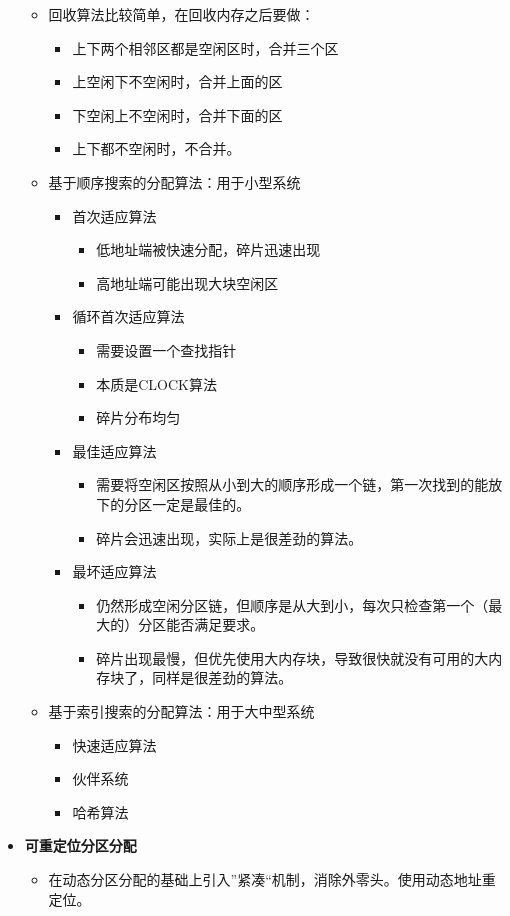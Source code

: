 \documentclass[12pt, a4paper, oneside]{ctexart}
\begin{document}
\begin{itemize}
\begin{itemize}
    \item 回收算法比较简单，在回收内存之后要做：
    \begin{itemize}
      \item 上下两个相邻区都是空闲区时，合并三个区
      \item 上空闲下不空闲时，合并上面的区
      \item 下空闲上不空闲时，合并下面的区
      \item 上下都不空闲时，不合并。
    \end{itemize}
    \item 基于顺序搜索的分配算法：用于小型系统
    \begin{itemize}
      \item 首次适应算法
      \begin{itemize}
        \item 低地址端被快速分配，碎片迅速出现
        \item 高地址端可能出现大块空闲区
      \end{itemize}
      \item 循环首次适应算法
      \begin{itemize}
        \item 需要设置一个查找指针
        \item 本质是CLOCK算法
        \item 碎片分布均匀
      \end{itemize}
      \item 最佳适应算法
      \begin{itemize}
        \item 需要将空闲区按照从小到大的顺序形成一个链，第一次找到的能放下的分区一定是最佳的。
        \item 碎片会迅速出现，实际上是很差劲的算法。
      \end{itemize}
      \item 最坏适应算法
      \begin{itemize}
        \item 仍然形成空闲分区链，但顺序是从大到小，每次只检查第一个（最大的）分区能否满足要求。
        \item 碎片出现最慢，但优先使用大内存块，导致很快就没有可用的大内存块了，同样是很差劲的算法。
      \end{itemize}
    \end{itemize}
    \item 基于索引搜索的分配算法：用于大中型系统
    \begin{itemize}
      \item 快速适应算法
      \item 伙伴系统
      \item 哈希算法
    \end{itemize}
  \end{itemize}
  \item {\bf 可重定位分区分配}
  \begin{itemize}
    \item 在动态分区分配的基础上引入”紧凑“机制，消除外零头。使用动态地址重定位。
  \end{itemize}
\end{itemize}
\end{document}
